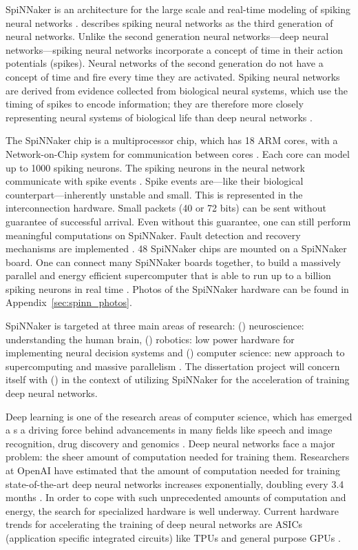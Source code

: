 \documentclass{article}
\begin{document}
SpiNNaker is an architecture for the large scale and
real-time modeling of spiking neural networks
\citep{furber_et_al_2006, furber_et_al_2006b,
  furber_et_al_2007}.
\citet{maass1997} describes spiking neural networks as the
third generation of neural networks.
Unlike the second generation neural networks---deep neural
networks---spiking neural networks incorporate a concept of time in
their action potentials (spikes).
Neural networks of the second generation do not have a
concept of time and fire every time they are activated.
Spiking neural networks are derived from evidence
collected from biological neural systems, which use the timing of
spikes to encode information; they are therefore more closely
representing neural systems of biological life than deep
neural networks \citep{maass1997}.

The SpiNNaker chip is a multiprocessor chip, which has 18 ARM
cores, with a Network-on-Chip system for
communication between cores \citep{furber_et_al_2007,
  spinn_proj}.
Each core can model up to 1000 spiking neurons.
The spiking neurons in the neural network communicate with
spike events \citep{furber_et_al_2007}.
Spike events are---like their biological
counterpart---inherently unstable and small.
This is represented in the interconnection hardware.
Small packets (40 or 72 bits) can be sent without
guarantee of successful arrival.
Even without this guarantee, one can still perform
meaningful computations on SpiNNaker.
Fault detection and recovery mechanisms are implemented
\citep{spinn_proj}.
48 SpiNNaker chips are mounted on a SpiNNaker board.
One can connect many SpiNNaker boards together, to build a
massively parallel and energy efficient supercomputer that
is able to run up to a billion spiking neurons in real time
\citep{furber_et_al_2007}.
Photos of the SpiNNaker hardware can be found in
Appendix~\ref{sec:spinn_photos}.

SpiNNaker is targeted at three main areas of research:
() neuroscience: understanding the human
brain, () robotics: low power hardware for
implementing neural decision systems and
() computer science: new approach to
supercomputing and massive parallelism \citep{spinn_proj}.
The dissertation project will concern itself with ()
in the context of utilizing SpiNNaker for the acceleration of training
deep neural networks.

Deep learning is one of the research areas of computer science, which
has emerged a s a driving force behind advancements in many fields
like speech and image recognition, drug discovery and genomics
\citep{lecun_et_al_2015}.
Deep neural networks face a major problem: the sheer
amount of computation needed for training them.
Researchers at OpenAI have estimated that the amount of
computation needed for training state-of-the-art deep
neural networks increases exponentially, doubling every
3.4 months \citep{openai2019}.
In order to cope with such unprecedented amounts of
computation and energy, the search for specialized hardware is well
underway.
Current hardware trends for accelerating the training of deep neural
networks are ASICs (application specific integrated circuits) like
TPUs and general purpose GPUs \citep{tpus, mittal_et_al_2019}.
\end{document}
